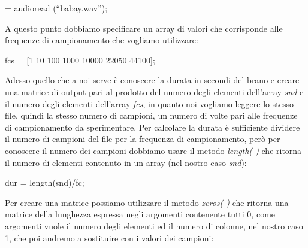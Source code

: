 \documentclass[11pt]{article}
\begin{document}
\begin{multicols*}{2}
\begin{center}
\begin{minipage}[c]{6cm}
\begin{sffamily}
[snd fc] = audioread (“babay.wav”); \\

\end{sffamily}
\end{minipage}
\end{center}

\noindent A questo punto dobbiamo specificare un array di valori che corrisponde alle frequenze di campionamento che vogliamo utilizzare:

\vspace{0.3cm}

\begin{center}
\begin{minipage}[c]{6cm}
\begin{sffamily}

fcs = [1 10 100 1000 10000 22050 44100]; \\

\end{sffamily}
\end{minipage}
\end{center}

\noindent Adesso quello che a noi serve è conoscere la durata in secondi del brano e creare una matrice di output pari al prodotto del numero degli elementi dell’array \textit {snd} e il numero degli elementi dell’array \textit {fcs}, in quanto noi vogliamo leggere lo stesso file, quindi la stesso numero di campioni, un numero di volte pari alle frequenze di campionamento da sperimentare. Per calcolare la durata è sufficiente dividere il numero di campioni del file per la frequenza di campionamento, però per conoscere il numero dei campioni dobbiamo usare il metodo \textit {length( )} che ritorna il numero di elementi contenuto in un array (nel nostro caso \textit{snd}):

\vspace{0.3cm}

\begin{center}
\begin{minipage}[c]{4cm}
\begin{sffamily}

dur = length(snd)/fc; \\

\end{sffamily}
\end{minipage}
\end{center}

\noindent Per creare una matrice possiamo utilizzare il metodo \textit {zeros( )} che ritorna una matrice della lunghezza espressa negli argomenti contenente tutti 0, come argomenti vuole il numero degli elementi ed il numero di colonne, nel nostro caso 1, che poi andremo a sostituire con i valori dei campioni:


\end{multicols*}
\end{document}
